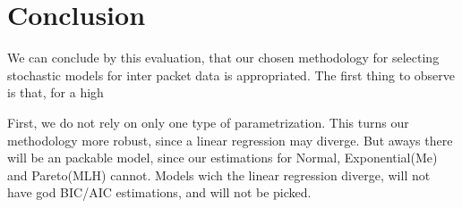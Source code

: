 \section{Conclusion}

We can conclude by this evaluation, that our chosen methodology for selecting stochastic models for inter packet data is appropriated. The first thing to observe is that, for a high 

First, we do not rely on only one type of parametrization. This turns our methodology more robust, since a linear regression may diverge. But aways there will be an packable model, since our estimations for Normal, Exponential(Me) and Pareto(MLH) cannot. Models wich the linear regression diverge, will not have god BIC/AIC estimations, and will not be picked. 



